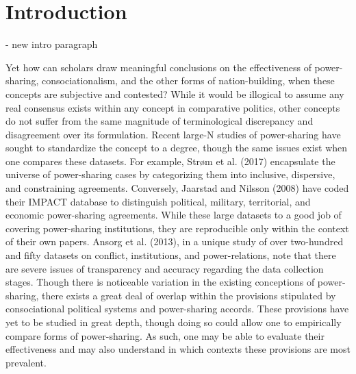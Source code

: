\documentclass[12pt]{article}
\begin{document}


\pagebreak


\doublespacing

\section{Introduction}

- new intro paragraph

Yet how can scholars draw meaningful conclusions on the effectiveness of power-sharing, consociationalism, and the other forms of nation-building, when these concepts are subjective and contested? While it would be illogical to assume any real consensus exists within any concept in comparative politics, other concepts do not suffer from the same magnitude of terminological discrepancy and disagreement over its formulation. Recent large-N studies of power-sharing have sought to standardize the concept to a degree, though the same issues exist when one compares these datasets. For example, Strøm et al. (2017) encapsulate the universe of power-sharing cases by categorizing them into inclusive, dispersive, and constraining agreements. Conversely, Jaarstad and Nilsson (2008) have coded their IMPACT database to distinguish political, military, territorial, and economic power-sharing agreements. While these large datasets to a good job of covering power-sharing institutions, they are reproducible only within the context of their own papers. Ansorg et al. (2013), in a unique study of over two-hundred and fifty datasets on conflict, institutions, and power-relations, note that there are severe issues of transparency and accuracy regarding the data collection stages. Though there is noticeable variation in the existing conceptions of power-sharing, there exists a great deal of overlap within the provisions stipulated by consociational political systems and power-sharing accords. These provisions have yet to be studied in great depth, though doing so could allow one to empirically compare forms of power-sharing. As such, one may be able to evaluate their effectiveness and may also understand in which contexts these provisions are most prevalent. 
\end{document}
